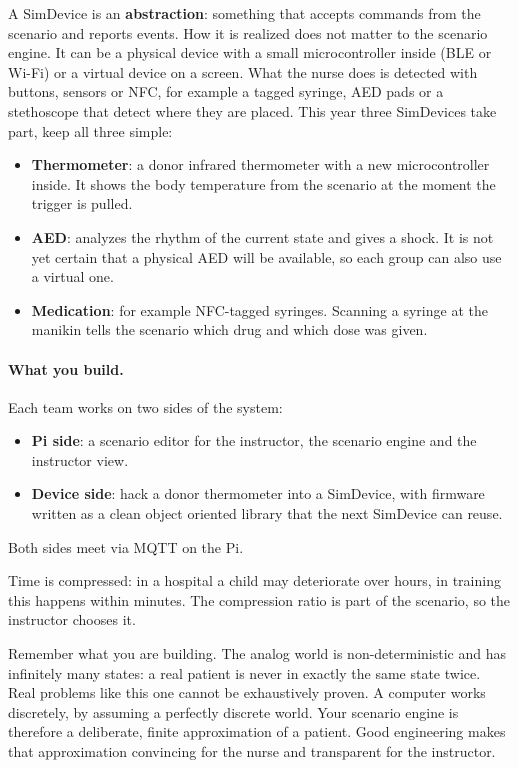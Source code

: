 \documentclass[11pt,a4paper]{article}
\begin{document}
A SimDevice is an \textbf{abstraction}: something that accepts commands from
the scenario and reports events. How it is realized does not matter to the
scenario engine. It can be a physical device with a small microcontroller
inside (BLE or Wi-Fi) or a virtual device on a screen. What the nurse does is detected with buttons,
sensors or NFC, for example a tagged syringe, AED pads or a stethoscope that
detect where they are placed. This year
three SimDevices take part, keep all three simple:
\begin{itemize}
  \item \textbf{Thermometer}: a donor infrared thermometer with a new
        microcontroller inside. It shows the body temperature from the
        scenario at the moment the trigger is pulled.
  \item \textbf{AED}: analyzes the rhythm of the current state and gives a
        shock. It is not yet certain that a physical AED will be available, so
        each group can also use a virtual one.
  \item \textbf{Medication}: for example NFC-tagged syringes. Scanning a
        syringe at the manikin tells the scenario which drug and which dose was
        given.
\end{itemize}

\paragraph{What you build.} Each team works on two sides of the system:
\begin{itemize}
  \item \textbf{Pi side}: a scenario editor for the instructor, the scenario
        engine and the instructor view.
  \item \textbf{Device side}: hack a donor thermometer into a SimDevice, with
        firmware written as a clean object oriented library that the next
        SimDevice can reuse.
\end{itemize}
Both sides meet via MQTT on the Pi.

Time is compressed: in a hospital a child may deteriorate over hours, in
training this happens within minutes. The compression ratio is part of the
scenario, so the instructor chooses it.

Remember what you are building. The analog world is non-deterministic and has
infinitely many states: a real patient is never in exactly the same state twice.
Real problems like this one cannot be exhaustively proven. A computer works
discretely, by assuming a perfectly discrete world. Your scenario engine is
therefore a deliberate, finite approximation of a patient. Good engineering
makes that approximation convincing for the nurse and transparent for the
instructor.
\end{document}
